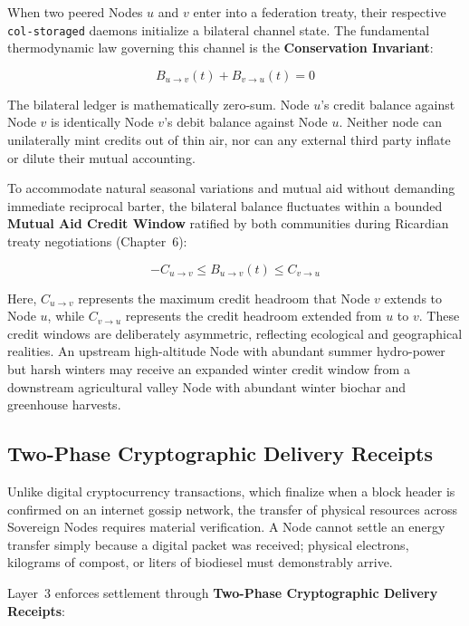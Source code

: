 When two peered Nodes $u$ and $v$ enter into a federation treaty, their respective \texttt{col-storaged} daemons initialize a bilateral channel state. The fundamental thermodynamic law governing this channel is the \textbf{Conservation Invariant}:

\begin{equation}
B_{u \to v}(t) + B_{v \to u}(t) = 0
\label{eq:ch4_bcc_conservation}
\end{equation}

The bilateral ledger is mathematically zero-sum. Node $u$'s credit balance against Node $v$ is identically Node $v$'s debit balance against Node $u$. Neither node can unilaterally mint credits out of thin air, nor can any external third party inflate or dilute their mutual accounting.

To accommodate natural seasonal variations and mutual aid without demanding immediate reciprocal barter, the bilateral balance fluctuates within a bounded \textbf{Mutual Aid Credit Window} ratified by both communities during Ricardian treaty negotiations (Chapter~6):

\begin{equation}
-C_{u \to v} \le B_{u \to v}(t) \le C_{v \to u}
\label{eq:ch4_credit_window}
\end{equation}

Here, $C_{u \to v}$ represents the maximum credit headroom that Node $v$ extends to Node $u$, while $C_{v \to u}$ represents the credit headroom extended from $u$ to $v$. These credit windows are deliberately asymmetric, reflecting ecological and geographical realities. An upstream high-altitude Node with abundant summer hydro-power but harsh winters may receive an expanded winter credit window from a downstream agricultural valley Node with abundant winter biochar and greenhouse harvests.

\subsection{Two-Phase Cryptographic Delivery Receipts}

Unlike digital cryptocurrency transactions, which finalize when a block header is confirmed on an internet gossip network, the transfer of physical resources across Sovereign Nodes requires material verification. A Node cannot settle an energy transfer simply because a digital packet was received; physical electrons, kilograms of compost, or liters of biodiesel must demonstrably arrive.

Layer~3 enforces settlement through \textbf{Two-Phase Cryptographic Delivery Receipts}:

